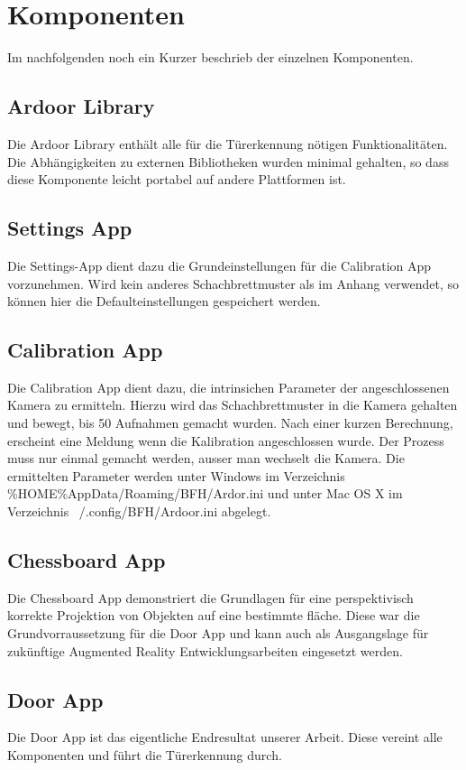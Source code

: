\chapter{Komponenten}

Im nachfolgenden noch ein Kurzer beschrieb der einzelnen Komponenten.

\section{Ardoor Library}
Die Ardoor Library enthält alle für die Türerkennung nötigen Funktionalitäten. Die Abhängigkeiten zu externen Bibliotheken wurden minimal gehalten, so dass diese Komponente leicht portabel auf andere Plattformen ist.

\section{Settings App}
Die Settings-App dient dazu die Grundeinstellungen für die Calibration App vorzunehmen. Wird kein anderes Schachbrettmuster als im Anhang verwendet, so können hier die Defaulteinstellungen gespeichert werden.

\section{Calibration App}
Die Calibration App dient dazu, die intrinsichen Parameter der angeschlossenen Kamera zu ermitteln. Hierzu wird das Schachbrettmuster in die Kamera gehalten und bewegt, bis 50 Aufnahmen gemacht wurden. Nach einer kurzen Berechnung, erscheint eine Meldung wenn die Kalibration angeschlossen wurde. Der Prozess muss nur einmal gemacht werden, ausser man wechselt die Kamera. Die ermittelten Parameter werden unter Windows im Verzeichnis \%HOME\%AppData/Roaming/BFH/Ardor.ini und unter Mac OS X im Verzeichnis ~/.config/BFH/Ardoor.ini abgelegt.

\section{Chessboard App}
Die Chessboard App demonstriert die Grundlagen für eine perspektivisch korrekte Projektion von Objekten auf eine bestimmte fläche. Diese war die Grundvorraussetzung für die Door App und kann auch als Ausgangslage für zukünftige Augmented Reality Entwicklungsarbeiten eingesetzt werden.

\section{Door App}
Die Door App ist das eigentliche Endresultat unserer Arbeit. Diese vereint alle Komponenten und führt die Türerkennung durch.
